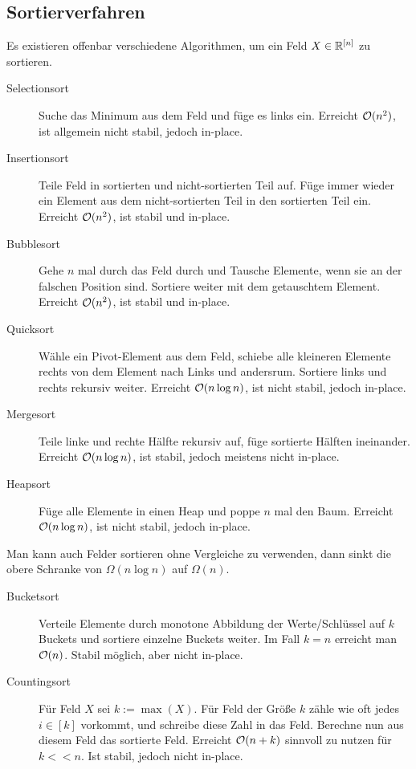 \subsection{Sortierverfahren}
Es existieren offenbar verschiedene Algorithmen, um ein Feld \(X \in \mathbb R^{[n]}\) zu sortieren.
\begin{description}
    \item[Selectionsort] Suche das Minimum aus dem Feld und füge es links ein.
        Erreicht \(\mathcal O(n^2)\), ist allgemein nicht stabil, jedoch in-place.

    \item[Insertionsort] Teile Feld in sortierten und nicht-sortierten Teil auf.
        Füge immer wieder ein Element aus dem nicht-sortierten Teil in den sortierten Teil ein.
        Erreicht \(\mathcal O(n^2)\), ist stabil und in-place.

    \item[Bubblesort] Gehe \(n\) mal durch das Feld durch und Tausche Elemente, wenn sie an der falschen Position sind.
        Sortiere weiter mit dem getauschtem Element.
        Erreicht \(\mathcal O(n^2)\), ist stabil und in-place.

    \item[Quicksort] Wähle ein Pivot-Element aus dem Feld, schiebe alle kleineren Elemente rechts von dem Element nach Links und andersrum.
        Sortiere links und rechts rekursiv weiter.
        Erreicht \(\mathcal O(n \log n)\), ist nicht stabil, jedoch in-place.

    \item[Mergesort] Teile linke und rechte Hälfte rekursiv auf, füge sortierte Hälften ineinander.
        Erreicht \(\mathcal O(n \log n)\), ist stabil, jedoch meistens nicht in-place.

    \item[Heapsort] Füge alle Elemente in einen Heap und poppe \(n\) mal den Baum.
        Erreicht \(\mathcal O(n \log n)\), ist nicht stabil, jedoch in-place.
\end{description}
Man kann auch Felder sortieren ohne Vergleiche zu verwenden, dann sinkt die obere Schranke von \(\Omega(n \log n)\) auf \(\Omega(n)\).
\begin{description}
    \item[Bucketsort] Verteile Elemente durch monotone Abbildung der Werte/Schlüssel auf \(k\) Buckets und sortiere einzelne Buckets weiter.
        Im Fall \(k = n\) erreicht man \(\mathcal O(n)\).
        Stabil möglich, aber nicht in-place.

    \item[Countingsort] Für Feld \(X\) sei \(k := \max(X)\).
        Für Feld der Größe \(k\) zähle wie oft jedes \(i \in [k]\) vorkommt, und schreibe diese Zahl in das Feld.
        Berechne nun aus diesem Feld das sortierte Feld.
        Erreicht \(\mathcal O(n+k)\) sinnvoll zu nutzen für \(k << n\).
        Ist stabil, jedoch nicht in-place.
\end{description}


